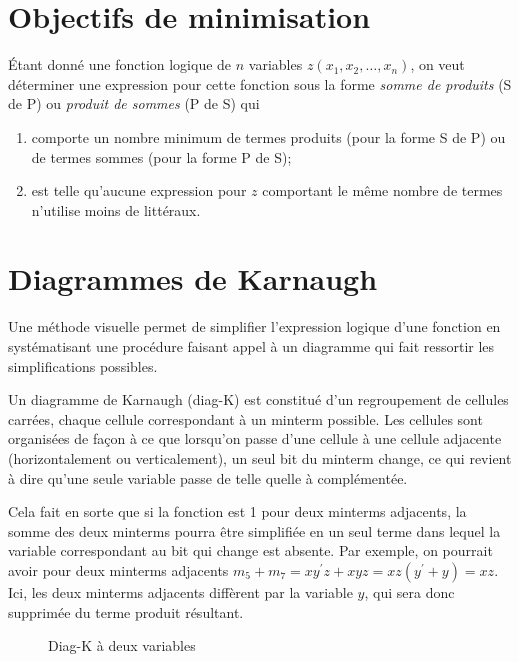 \documentclass[letter, oneside]{book}
\begin{document}
\section{Objectifs de minimisation}
\label{sec:org044ac2a}

Étant donné une fonction logique de \(n\) variables \(z(x_1, x_2, \ldots,
x_n)\), on veut déterminer une expression pour cette fonction sous la
forme \emph{somme de produits} (S de P) ou \emph{produit de sommes} (P de S) qui

\begin{enumerate}
\item comporte un nombre minimum de termes produits (pour la forme S de P)
ou de termes sommes (pour la forme P de S);

\item est telle qu'aucune expression pour \(z\) comportant le même nombre
de termes n'utilise moins de littéraux.
\end{enumerate}

\section{Diagrammes de Karnaugh}
\label{sec:org2c5de25}

Une méthode visuelle permet de simplifier l'expression logique d'une
fonction en systématisant une procédure faisant appel à un diagramme
qui fait ressortir les simplifications possibles.

Un diagramme de Karnaugh (diag-K) est constitué d'un regroupement de
cellules carrées, chaque cellule correspondant à un minterm
possible. Les cellules sont organisées de façon à ce que lorsqu'on
passe d'une cellule à une cellule adjacente (horizontalement ou
verticalement), un seul bit du minterm change, ce qui revient à dire
qu'une seule variable passe de telle quelle à complémentée.

Cela fait en sorte que si la fonction est 1 pour deux minterms
adjacents, la somme des deux minterms pourra être simplifiée en un
seul terme dans lequel la variable correspondant au bit qui change est
absente. Par exemple, on pourrait avoir pour deux minterms adjacents
\(m_5 + m_7 = xy^\prime z + xyz = xz(y^\prime + y) = xz\). Ici, les
deux minterms adjacents diffèrent par la variable \(y\), qui sera donc
supprimée du terme produit résultant.

\begin{figure}[htbp]
\centering

\caption{\label{fig:org18a328e}Diag-K à deux variables}
\end{figure}
\end{document}
